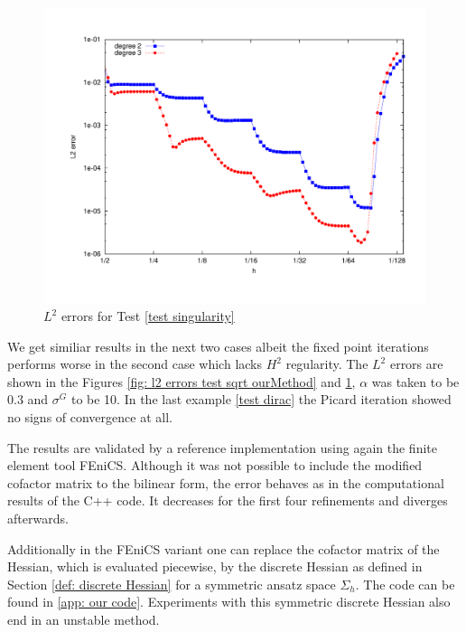   
  \begin{figure}[H]
  	\centering
  	\includegraphics[scale =0.37]{plots/MA2.pdf}
  	\caption{$L^2$ errors for Test \ref{test singularity}}
  	\label{fig: l2 errors test singularity ourMethod}
  \end{figure}
We get similiar results in the next two cases albeit the fixed point iterations performs worse in the second case which lacks $H^2$ regularity. The $L^2$ errors are shown in the Figures \ref{fig: l2 errors test sqrt ourMethod} and \ref{fig: l2 errors test singularity ourMethod}, $\alpha$ was taken to be 0.3 and $\sigma^G$ to be 10. In the last example \ref{test dirac} the Picard iteration showed no signs of convergence at all.

The results are validated by a reference implementation using again the finite element tool FEniCS. Although it was not possible to include the modified cofactor matrix to the bilinear form, the error behaves as in the computational results of the C++ code. It decreases for the first four refinements and diverges afterwards. 

Additionally in the FEniCS variant one can replace the cofactor matrix of the Hessian, which is evaluated piecewise, by the discrete Hessian as defined in Section \ref{def: discrete Hessian} for a symmetric ansatz space $\Sigma_h$. The code can be found in \ref{app: our code}. Experiments with this symmetric discrete Hessian also end in an unstable method.
